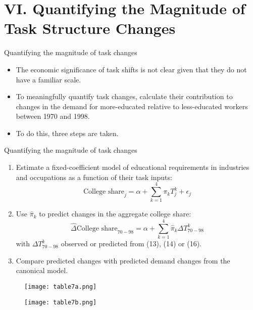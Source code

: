 \documentclass[notes=show]{beamer}
\begin{document}
\section{VI. Quantifying the Magnitude of Task Structure Changes}

\begin{frame}{Quantifying the magnitude of task changes}
\begin{itemize}
\item The economic significance of task shifts is not clear given that they do not have a familiar scale. \medskip
\item To meaningfully quantify task changes, calculate their contribution to changes in the demand for more-educated relative to less-educated workers between 1970 and 1998. \medskip
\item To do this, three steps are taken.
\end{itemize}
\end{frame}

\begin{frame}{Quantifying the magnitude of task changes}
\begin{enumerate}
\item Estimate a fixed-coefficient model of educational requirements in industries and occupations as a function of their task inputs:
\[
\text{College share}_{j} = \alpha + \sum_{k=1}^{4} \pi_{k} T_{j}^{k} + \epsilon_{j} \tag{17} \label{eq17}
\]
\item Use $ \hat{\pi}_{k}$ to predict changes in the aggregate college share:
\[
\hat{\Delta} \text{College share}_{70-98} = \alpha + \sum_{k=1}^{4} \hat{\pi}_{k} \Delta T_{70-98}^{k} \tag{18} \label{eq18}
\]
with $\Delta T_{70-98}^{k}$ observed or predicted from (13), (14) or (16). \medskip
\item Compare predicted changes with predicted demand changes from the canonical model.
\end{enumerate}
\end{frame}

\newpage
\begin{center}
\begin{figure}
\texttt{[image: table7a.png]}
\end{figure} 
\end{center}
\newpage

\newpage
\begin{center}
\begin{figure}
\texttt{[image: table7b.png]}
\end{figure} 
\end{center}
\newpage
\end{document}
